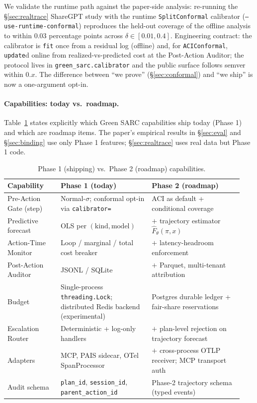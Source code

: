 \documentclass[11pt]{article}
\theoremstyle{plain}
\theoremstyle{definition}
\theoremstyle{remark}
\begin{document}
We validate the runtime path against the paper-side analysis: re-running the \S\ref{sec:realtrace} ShareGPT study with the runtime \texttt{SplitConformal} calibrator (\texttt{--use-runtime-conformal}) reproduces the held-out coverage of the offline analysis to within $0.03$ percentage points across $\delta\in[0.01,0.4]$. Engineering contract: the calibrator is \texttt{fit} once from a residual log (offline) and, for \texttt{ACIConformal}, \texttt{update}d online from realized-vs-predicted cost at the Post-Action Auditor; the protocol lives in \texttt{green\_sarc.calibrator} and the public surface follows semver within $0.x$. The difference between ``we prove'' (\S\ref{sec:conformal}) and ``we ship'' is now a one-argument opt-in.

\paragraph{Capabilities: today vs.\ roadmap.} Table~\ref{tab:roadmap} states explicitly which Green SARC capabilities ship today (Phase 1) and which are roadmap items. The paper's empirical results in \S\ref{sec:eval} and \S\ref{sec:binding} use only Phase 1 features; \S\ref{sec:realtrace} uses real data but Phase 1 code.

\begin{table}[H]
\centering\small
\begin{tabular}{@{}p{0.215\linewidth} p{0.36\linewidth} p{0.36\linewidth}@{}}
\toprule
\textbf{Capability} & \textbf{Phase 1 (today)} & \textbf{Phase 2 (roadmap)} \\
\midrule
Pre-Action Gate (step) & Normal-$\sigma$; conformal opt-in via \texttt{calibrator=} & ACI as default + conditional coverage \\
Predictive forecast & OLS per $(\text{kind},\text{model})$ & $+$ trajectory estimator $\hat F_\theta(\pi,x)$ \\
Action-Time Monitor & Loop / marginal / total cost breaker & $+$ latency-headroom enforcement \\
Post-Action Auditor & JSONL / SQLite & $+$ Parquet, multi-tenant attribution \\
Budget & Single-process \texttt{threading.Lock}; distributed Redis backend (experimental) & Postgres durable ledger + fair-share reservations \\
Escalation Router & Deterministic + log-only handlers & $+$ plan-level rejection on trajectory forecast \\
Adapters & MCP, PAIS sidecar, OTel SpanProcessor & $+$ cross-process OTLP receiver; MCP transport auth \\
Audit schema & \texttt{plan\_id}, \texttt{session\_id}, \texttt{parent\_action\_id} & Phase-2 trajectory schema (typed events) \\
\bottomrule
\end{tabular}
\caption{Phase 1 (shipping) vs.\ Phase 2 (roadmap) capabilities.}
\label{tab:roadmap}
\end{table}
\end{document}
